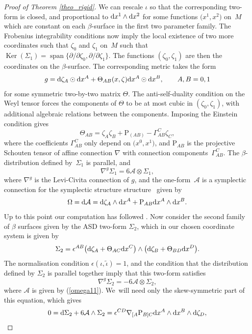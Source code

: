 \documentclass[10pt,a4paper]{article}
\numberwithin{equation}{section}
\newcommand{\Rho}{\mathrm{P}}
\def\be{\begin{equation}}
\def\ee{\end{equation}}
\begin{document}
\begin{proof}[Proof of Theorem \ref{theo_rigid}]
We can rescale $\iota$ so that the corresponding two-form is
closed, and proportional to \mbox{${\rm d}x^1\wedge {\rm d}x^2$} for some functions $\big(x^1, x^2\big)$ on~$M$
which are constant on each $\beta$-surface in the first two parameter family.
The Frobenius integrability conditions now imply the local existence of
two more coordinates such that
$\zeta_0$ and $\zeta_1$ on~$M$ such that $\operatorname{Ker}(\Sigma_1)=
\operatorname{span}\{\partial/\partial \zeta_0, \partial/\partial \zeta_1\}$.
The functions $(\zeta_0, \zeta_1)$ are then the coordinates on the $\beta$-surface.
The corresponding metric takes the form
\be
\label{metric_md}
g={\rm d}\zeta_A\odot {\rm d}x^A+\Theta_{AB}(x, \zeta){\rm d}x^A\odot {\rm d}x^B, \qquad A, B=0, 1
\ee
for some symmetric two-by-two matrix $\Theta$. The anti-self-duality
condition on the Weyl tensor forces the components of $\Theta$ to be at most
cubic in $(\zeta_0, \zeta_1)$, with additional algebraic relations between the components. Imposing the Einstein condition gives
\be
\label{thetaAB}
\Theta_{AB}=\zeta_A\zeta_B+\Rho_{(AB)}-\Gamma_{AB}^C\zeta_C,
\ee
where the coefficients $\Gamma_{AB}^C$ only depend on $\big(x^0, x^1\big)$,
and $\Rho_{AB}$ is the projective Schouten tensor of
affine connection $\nabla$ with connection components~$\Gamma_{AB}^C$.
The $\beta$-distribution defined by~$\Sigma_1$ is parallel, and
\[
\nabla^g \Sigma_1=6{\mathcal A}\otimes \Sigma_1,
\]
where $\nabla^g$ is the Levi-Civita connection of $g$, and the one-form~${\mathcal A}$ is a symplectic connection for the symplectic structure
structure~\cite{DM} given by
\be\label{omega11}
\Omega={\rm d}{\mathcal A}={\rm d}\zeta_A\wedge {\rm d}x^A+\Rho_{AB}{\rm d}x^A\wedge {\rm d}x^B.
\ee
Up to this point our computation has followed \cite{DM}. Now consider the second
family of $\beta$ surfaces given by the ASD two-form $\Sigma_2$, which in our
chosen coordinate system is given by
\[
\Sigma_2= \epsilon^{AB}\big({\rm d}\zeta_A+\Theta_{AC}{\rm d}x^C\big)\wedge \big({\rm d}\zeta_B+\Theta_{BD}{\rm d}x^D\big).
\]
The normalisation condition $\epsilon(\iota, \tilde{\iota})=1$, and
the condition that the distribution defined by $\Sigma_2$ is parallel
together imply that this two-form satisfies
\[
\nabla^g\Sigma_2=-6{\mathcal A}\otimes \Sigma_2,
\]
where ${\mathcal A}$ is given by (\ref{omega11}). We~will need only the skew-symmetric part of
this equation, which gives
\begin{gather*}
0={\rm d}\Sigma_2+6{\mathcal A}\wedge\Sigma_2 =\epsilon^{CD}\nabla_{[A}\Rho_{B]C} {\rm d}x^A\wedge {\rm d}x^B\wedge {\rm d}\zeta_D,
\end{gather*}

\end{proof}
\end{document}
